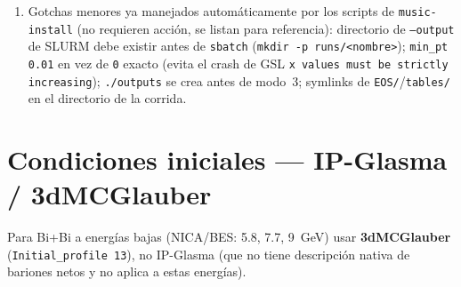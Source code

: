 \documentclass[11pt]{article}
\begin{document}
\begin{enumerate}[leftmargin=*]
  checkout aparte de \texttt{epos/} al lado. Instalar con:
\begin{Verbatim}[fontsize=\small]
./apply_2dtexs.sh /software/mexnica/MUSIC/music
\end{Verbatim}
  Este script hace todo en un solo paso: copia los archivos nuevos, reemplaza
  \texttt{eos.cpp}/\texttt{CMakeLists.txt}, aplica
  \texttt{freeze\_pseudo.patch} y \texttt{read\_in\_parameters.patch} (si ya
  se corrió \texttt{apply\_music\_fixes.sh} antes, los detecta ya aplicados
  y no falla), copia la tabla a \texttt{\$MUSIC\_DIR/EOS/2DTExS/} y
  recompila. Si solo se necesita la física estándar (\texttt{EOS\_to\_use 9},
  hotQCD) no hace falta correr este paso --- basta con
  \texttt{apply\_music\_fixes.sh} del punto anterior.
  \item Gotchas menores ya manejados automáticamente por los scripts de
  \texttt{music-install} (no requieren acción, se listan para referencia):
  directorio de \texttt{--output} de SLURM debe existir antes de
  \texttt{sbatch} (\texttt{mkdir -p runs/<nombre>}); \texttt{min\_pt 0.01}
  en vez de \texttt{0} exacto (evita el crash de GSL
  \texttt{x values must be strictly increasing}); \texttt{./outputs} se
  crea antes de modo~3; symlinks de \texttt{EOS/}/\texttt{tables/} en el
  directorio de la corrida.
\end{enumerate}

\section{Condiciones iniciales --- IP-Glasma / 3dMCGlauber}

Para Bi+Bi a energías bajas (NICA/BES: 5.8, 7.7, 9~GeV) usar
\textbf{3dMCGlauber} (\texttt{Initial\_profile 13}), no IP-Glasma (que no
tiene descripción nativa de bariones netos y no aplica a estas energías).
\end{document}

